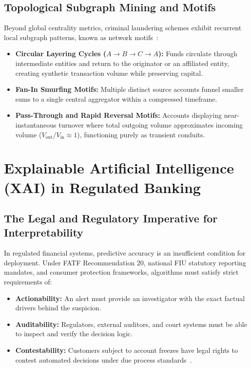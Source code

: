 \subsection{Topological Subgraph Mining and Motifs}
Beyond global centrality metrics, criminal laundering schemes exhibit recurrent local subgraph patterns, known as network motifs~\cite{morselli2009inside}:
\begin{itemize}
    \item \textbf{Circular Layering Cycles ($A \rightarrow B \rightarrow C \rightarrow A$):} Funds circulate through intermediate entities and return to the originator or an affiliated entity, creating synthetic transaction volume while preserving capital.
    \item \textbf{Fan-In Smurfing Motifs:} Multiple distinct source accounts funnel smaller sums to a single central aggregator within a compressed timeframe.
    \item \textbf{Pass-Through and Rapid Reversal Motifs:} Accounts displaying near-instantaneous turnover where total outgoing volume approximates incoming volume ($V_{\text{out}} / V_{\text{in}} \approx 1$), functioning purely as transient conduits.
\end{itemize}

\section{Explainable Artificial Intelligence (XAI) in Regulated Banking}
\subsection{The Legal and Regulatory Imperative for Interpretability}
In regulated financial systems, predictive accuracy is an insufficient condition for deployment. Under FATF Recommendation 20, national FIU statutory reporting mandates, and consumer protection frameworks, algorithms must satisfy strict requirements of:
\begin{itemize}
    \item \textbf{Actionability:} An alert must provide an investigator with the exact factual drivers behind the suspicion.
    \item \textbf{Auditability:} Regulators, external auditors, and court systems must be able to inspect and verify the decision logic.
    \item \textbf{Contestability:} Customers subject to account freezes have legal rights to contest automated decisions under due process standards~\cite{dovsilovic2018explainable, shukladeep}.
\end{itemize}

